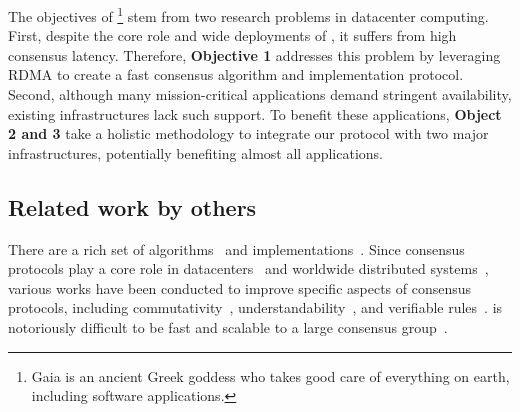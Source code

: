 The objectives of \xxx\footnote{Gaia is an ancient Greek goddess who takes good 
care of everything on earth, including software applications.} stem from two 
research problems in datacenter computing. First, despite the core role and 
wide deployments of \paxos, it suffers from high consensus latency. Therefore, 
\textbf{Objective 1} addresses this problem by leveraging RDMA to create a 
fast consensus algorithm and implementation protocol. Second, although many 
mission-critical applications demand stringent availability, existing 
infrastructures lack such support. To benefit these applications, 
\textbf{Object 2 and 3} take a holistic methodology to integrate our protocol 
with two major infrastructures, potentially benefiting almost all applications.


\subsection{Related work by others} 
\label{sec:others-work}\vspace{-.075in}

There are a rich set of \paxos 
algorithms~\cite{paxos:practical,paxos,paxos:simple,paxos:complex,
epaxos:sosp13} 
and implementations~\cite{paxos:live,paxos:practical,chubby:osdi,crane:sosp15}. 
Since consensus protocols play a core role in 
datacenters~\cite{matei:hotcloud11, mesos:nsdi11, 
datacenter:os} and worldwide 
distributed systems~\cite{spanner:osdi12,mencius:osdi08}, various works 
have been conducted to improve specific aspects of consensus protocols, 
including commutativity~\cite{epaxos:sosp13}, 
understandability~\cite{raft:usenix14,paxos}, and verifiable 
rules~\cite{modist:nsdi09,demeter:sosp11}. \paxos is notoriously difficult to be 
fast and scalable to a large consensus 
group~\cite{ellis:thesis,manos:hotdep10,scatter:sosp11}. 

